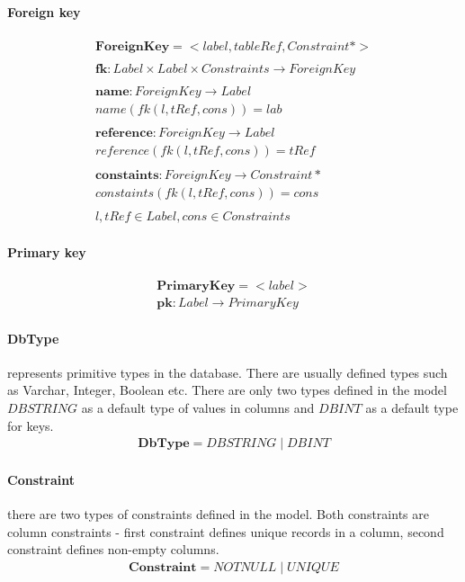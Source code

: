 \documentclass[11pt]{article}
\begin{document}
\paragraph{Foreign key}
\begin{align*}
	\mathbf{ForeignKey} = <label, tableRef, Constraint*> \\ \\
	\mathbf{fk} : Label \times Label \times Constraints \rightarrow ForeignKey \\ \\
	\mathbf{name} : ForeignKey \rightarrow Label \\
	name(fk(l, tRef, cons)) = lab  \\ \\
	\mathbf{reference} : ForeignKey \rightarrow Label  \\
	reference(fk(l, tRef, cons)) = tRef  \\ \\
	\mathbf{constaints} : ForeignKey \rightarrow Constraint*  \\
	constaints(fk(l, tRef, cons)) = cons  \\ \\
l, tRef \in Label, cons \in Constraints
\end{align*}


\paragraph{Primary key}
\begin{align*}
	\mathbf{PrimaryKey} =  < label > 	\\
	\mathbf{pk} : Label \rightarrow PrimaryKey
\end{align*}

\paragraph{DbType} represents primitive types in the database. There are usually defined types such as Varchar, Integer, Boolean etc. There are only two types defined in the model $DBSTRING$ as a default type of values in columns and $DBINT$ as a default type for keys.
\begin{align*}
	\mathbf{DbType} = DBSTRING \; | \; DBINT 
\end{align*}

\paragraph{Constraint} there are two types of constraints defined in the model. Both constraints are column constraints - first constraint defines unique records in a column, second constraint defines non-empty columns.
\begin{align*}
	\mathbf{Constraint} = NOTNULL \; | \; UNIQUE 
\end{align*}
\end{document}

